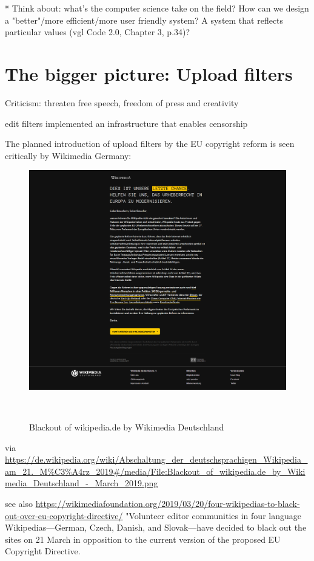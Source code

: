 * Think about: what's the computer science take on the field? How can we design a "better"/more efficient/more user friendly system? A system that reflects particular values (vgl Code 2.0, Chapter 3, p.34)?

\section{The bigger picture: Upload filters}

Criticism: threaten free speech, freedom of press and creativity

edit filters implemented an infrastructure that enables censorship

The planned introduction of upload filters by the EU copyright reform is seen critically by Wikimedia Germany:
\begin{figure}
\centering
  \includegraphics[width=0.9\columnwidth]{pics/Blackout_of_wikipediade_by_Wikimedia_Deutschland_-_March_2019.png}
  \caption{Blackout of wikipedia.de by Wikimedia Deutschland}~\label{fig:blackout-upload-filters}
\end{figure}

via
\url{https://de.wikipedia.org/wiki/Abschaltung_der_deutschsprachigen_Wikipedia_am_21._M%C3%A4rz_2019#/media/File:Blackout_of_wikipedia.de_by_Wikimedia_Deutschland_-_March_2019.png}

see also
\url{https://wikimediafoundation.org/2019/03/20/four-wikipedias-to-black-out-over-eu-copyright-directive/}
"Volunteer editor communities in four language Wikipedias—German, Czech, Danish, and Slovak—have decided to black out the sites on 21 March in opposition to the current version of the proposed EU Copyright Directive.

